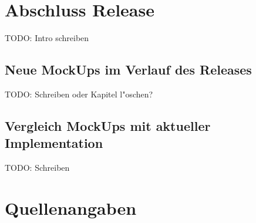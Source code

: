 \documentclass[12pt, titlepage]{scrartcl}
\newcommand{\RN}[1]{%
	\textup{\uppercase\expandafter{\romannumeral#1}}%
}
\begin{document}
	\section{Abschluss Release \RN{3}}
		TODO: Intro schreiben
		\subsection{Neue MockUps im Verlauf des Releases \RN{3}}
		TODO: Schreiben oder Kapitel l"oschen?
		\subsection{Vergleich MockUps mit aktueller Implementation}
		TODO: Schreiben
	\newpage
	\section{Quellenangaben}
		\listoffigures
		\listoftables
\end{document}

